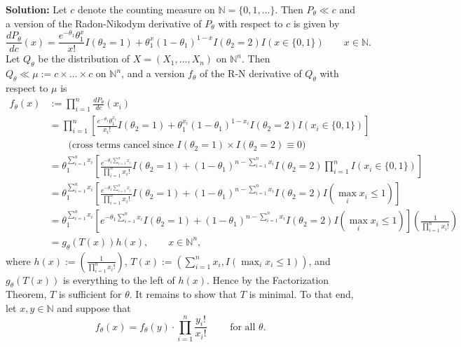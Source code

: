 \documentclass[12pt]{article}
\begin{document}
{\bf Solution:}
Let $c$ denote the counting measure on $\mathbb{N} = \{0, 1, \dots\}$. Then $P_{\theta} \ll c$ and a version of the Radon-Nikodym derivative
of $P_{\theta}$ with respect to $c$ is given by 
\[
  \frac{dP_{\theta}}{dc}(x) = \frac{e^{-\theta_{1}}\theta_{1}^{x}}{x!}I(\theta_{2} = 1) + \theta_{1}^{x}(1 - \theta_1)^{1-x}I(\theta_2 =
  2)I(x\in\{0,1\}) \qquad x \in \mathbb{N}.
\]
Let $Q_{\theta}$ be the distribution of $X = (X_{1}, \dots, X_{n})$ on $\mathbb{N}^{n}$. Then $Q_{\theta} \ll \mu := c \times \dots \times c$ on
$\mathbb{N}^{n}$, and a version $f_{\theta}$ of the R-N derivative of $Q_{\theta}$ with respect to $\mu$ is 
\begin{align*}
  f_{\theta}(x) & := \prod_{i=1}^{n} \frac{dP_{\theta}}{dc}(x_{i}) \\
  & = \prod_{i=1}^{n}\left[ \frac{e^{-\theta_{1}}\theta_{1}^{x_{i}}}{x_{i}!}I(\theta_{2} = 1) + \theta_{1}^{x_{i}}(1 - \theta_1)^{1-x_{i}}I(\theta_2 = 2)I(x_{i}\in\{0,1\}) \right] \\
  & \qquad \text{(cross terms cancel since $I(\theta_2 = 1)\times I(\theta_2 = 2) \equiv 0$)} \\
  & = \theta_{1}^{\sum_{i=1}^{n}x_{i}}\left[ \frac{ e^{-\theta_1 \sum_{i=1}^{n} x_{i}} }{ \prod_{i=1}^{n}x_{i}!} I(\theta_2 = 1) + (1 - \theta_1)^{n -
    \sum_{i=1}^{n}x_{i}} I(\theta_2 = 2)\prod_{i=1}^{n} I(x_{i} \in \{0,1\}) \right] \\
  & = \theta_{1}^{\sum_{i=1}^{n}x_{i}}\left[ \frac{ e^{-\theta_1 \sum_{i=1}^{n} x_{i}} }{ \prod_{i=1}^{n}x_{i}!} I(\theta_2 = 1) + (1 - \theta_1)^{n -
    \sum_{i=1}^{n}x_{i}} I(\theta_2 = 2) I(\max_i x_{i} \leq 1) \right] \\
  & = \theta_{1}^{\sum_{i=1}^{n}x_{i}}\left[ e^{-\theta_1 \sum_{i=1}^{n} x_{i}} I(\theta_2 = 1) + (1 - \theta_1)^{n -
  \sum_{i=1}^{n}x_{i}} I(\theta_2 = 2) I(\max_i x_{i} \leq 1) \right] \left( \frac{1}{\prod_{i=1}^{n}x_{i}!} \right) \\
  & = g_{\theta}(T(x)) h(x), \qquad x \in \mathbb{N}^{n}, 
\end{align*}
where $h(x) := \left( \frac{1}{\prod_{i=1}^{n}x_{i}!} \right)$, $T(x) := \left( \sum_{i=1}^{n}x_{i}, I(\max_{i} x_{i} \leq 1 )\right)$, and
$g_{\theta}(T(x))$ is everything to the left of $h(x)$. Hence by the Factorization Theorem, $T$ is sufficient for $\theta$.
It remains to show that $T$ is minimal. To that end, let $x, y \in \mathbb{N}$ and suppose that 
\begin{equation}
  f_{\theta}(x) = f_{\theta}(y) \cdot \prod_{i=1}^{n}\frac{y_{i}!}{x_{i}!} \qquad \text{ for all $\theta$. }
  \label{7.1}
\end{equation}
\end{document}

